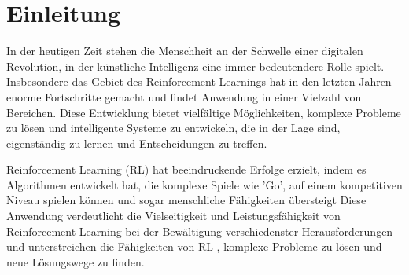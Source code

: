 
\chapter{Einleitung}

In der heutigen Zeit stehen die Menschheit an der Schwelle einer digitalen Revolution, in der künstliche Intelligenz eine immer bedeutendere Rolle spielt. Insbesondere das Gebiet des Reinforcement Learnings hat in den letzten Jahren enorme Fortschritte gemacht und findet Anwendung in einer Vielzahl von Bereichen. Diese Entwicklung bietet vielfältige Möglichkeiten, komplexe Probleme zu lösen und intelligente Systeme zu entwickeln, die in der Lage sind, eigenständig zu lernen und Entscheidungen zu treffen. 

Reinforcement Learning (RL) hat beeindruckende Erfolge erzielt, indem es Algorithmen entwickelt hat, die komplexe Spiele wie 'Go', auf einem kompetitiven Niveau spielen können und sogar menschliche Fähigkeiten übersteigt Diese Anwendung verdeutlicht die Vielseitigkeit und Leistungsfähigkeit von Reinforcement Learning bei der Bewältigung verschiedenster Herausforderungen und unterstreichen die Fähigkeiten von RL , komplexe Probleme zu lösen und neue Lösungswege zu finden.\cite{hui_alphago_2018, noauthor_alphago_2020} 

